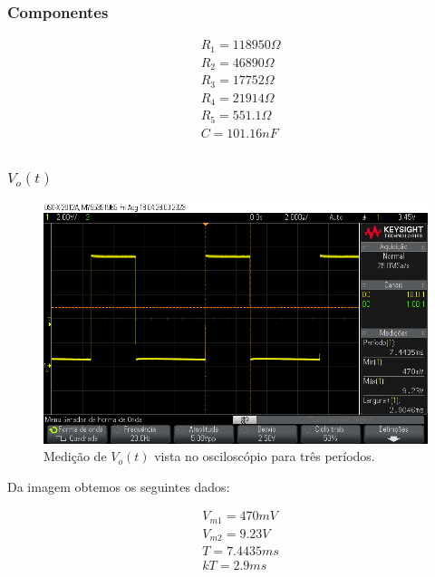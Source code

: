 \subsubsection{Componentes}

\begin{equation}
    \begin{aligned}
         & R_1 = 118950 \varOmega \\
         & R_2 = 46890 \varOmega  \\
         & R_3 = 17752 \varOmega  \\
         & R_4 = 21914 \varOmega  \\
         & R_5 = 551.1 \varOmega  \\
         & C = 101.16nF           \\
    \end{aligned}
\end{equation}


\subsubsection{$V_o (t)$}

\begin{figure}[H]
    \centering
    \includegraphics[width=0.7\columnwidth]{images/ex2_vo.png}
    \caption{Medição de $V_o(t)$ vista no osciloscópio para três períodos.}
\end{figure}

Da imagem obtemos os seguintes dados:

\begin{equation}
    \begin{aligned}
         & V_{m1} = 470mV \\
         & V_{m2} = 9.23V \\
         & T = 7.4435ms   \\
         & kT =  2.9ms    \\
    \end{aligned}
\end{equation}


